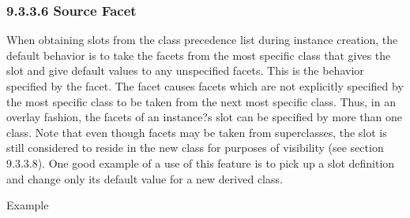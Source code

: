 \documentclass[letterpaper,10pt,english]{sphinxmanual}
\begin{document}
\subsubsection{9.3.3.6 Source Facet}
\label{\detokenize{cool:source-facet}}
When obtaining slots from the class precedence list during instance
creation, the default behavior is to take the facets from the most
specific class that gives the slot and give default values to any
unspecified facets. This is the behavior specified by the 
facet. The  facet causes facets which are not explicitly
specified by the most specific class to be taken from the next most
specific class. Thus, in an overlay fashion, the facets of an instance?s
slot can be specified by more than one class. Note that even though
facets may be taken from superclasses, the slot is still considered to
reside in the new class for purposes of visibility (see section
9.3.3.8). One good example of a use of this feature is to pick up a slot
definition and change only its default value for a new derived class.

Example
\end{document}

